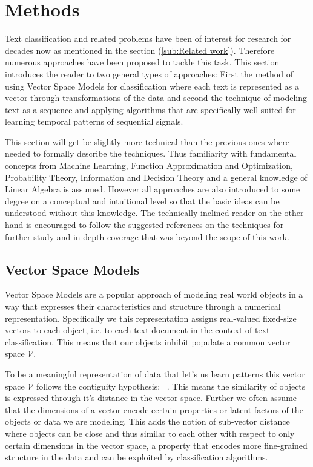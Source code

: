 
\clearpage

\section{Methods}
\label{sec:Methods}

Text classification and related problems have been of interest for research for decades now as mentioned in the  section (\ref{sub:Related work}). Therefore numerous approaches have been proposed to tackle this task. This section introduces the reader to two general types of approaches: First the method of using Vector Space Models for classification where each text is represented as a vector through transformations of the data and second the technique of modeling text as a sequence and applying algorithms that are specifically well-suited for learning temporal patterns of sequential signals.

This section will get be slightly more technical than the previous ones where needed to formally describe the techniques. Thus familiarity with fundamental concepts from Machine Learning, Function Approximation and Optimization, Probability Theory, Information and Decision Theory and a general knowledge of Linear Algebra is assumed. However all approaches are also introduced to some degree on a conceptual and intuitional level so that the basic ideas can be understood without this knowledge. The technically inclined reader on the other hand is encouraged to follow the suggested references on the techniques for further study and in-depth coverage that was beyond the scope of this work.

\subsection{Vector Space Models}
\label{sub:Vector Space Models}

Vector Space Models are a popular approach of modeling real world objects in a way that expresses their characteristics and structure through a numerical representation. Specifically we this representation assigns real-valued fixed-size vectors to each object, i.e. to each text document in the context of text classification. This means that our objects inhibit populate a common vector space $\mathcal{V}$.

To be a meaningful representation of data that let's us learn patterns this vector space $\mathcal{V}$ follows the contiguity hypothesis: ~\cite[Chapter 14, p.~289]{Manning:2008aa}. This means the similarity of objects is expressed through it's distance in the vector space. Further we often assume that the dimensions of a vector encode certain properties or latent factors of the objects or data we are modeling. This adds the notion of sub-vector distance where objects can be close and thus similar to each other with respect to only certain dimensions in the vector space, a property that encodes more fine-grained structure in the data and can be exploited by classification algorithms.

